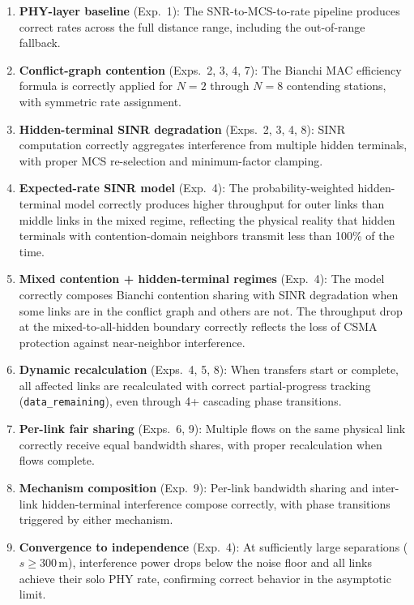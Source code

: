 \documentclass[11pt,a4paper]{article}
\begin{document}
\begin{enumerate}
    \item \textbf{PHY-layer baseline} (Exp.~1): The SNR-to-MCS-to-rate pipeline produces correct rates across the full distance range, including the out-of-range fallback.

    \item \textbf{Conflict-graph contention} (Exps.~2, 3, 4, 7): The Bianchi MAC efficiency formula is correctly applied for $N = 2$ through $N = 8$ contending stations, with symmetric rate assignment.

    \item \textbf{Hidden-terminal SINR degradation} (Exps.~2, 3, 4, 8): SINR computation correctly aggregates interference from multiple hidden terminals, with proper MCS re-selection and minimum-factor clamping.

    \item \textbf{Expected-rate SINR model} (Exp.~4): The probability-weighted hidden-terminal model correctly produces higher throughput for outer links than middle links in the mixed regime, reflecting the physical reality that hidden terminals with contention-domain neighbors transmit less than 100\% of the time.

    \item \textbf{Mixed contention + hidden-terminal regimes} (Exp.~4): The model correctly composes Bianchi contention sharing with SINR degradation when some links are in the conflict graph and others are not. The throughput drop at the mixed-to-all-hidden boundary correctly reflects the loss of CSMA protection against near-neighbor interference.

    \item \textbf{Dynamic recalculation} (Exps.~4, 5, 8): When transfers start or complete, all affected links are recalculated with correct partial-progress tracking (\texttt{data\_remaining}), even through 4+ cascading phase transitions.

    \item \textbf{Per-link fair sharing} (Exps.~6, 9): Multiple flows on the same physical link correctly receive equal bandwidth shares, with proper recalculation when flows complete.

    \item \textbf{Mechanism composition} (Exp.~9): Per-link bandwidth sharing and inter-link hidden-terminal interference compose correctly, with phase transitions triggered by either mechanism.

    \item \textbf{Convergence to independence} (Exp.~4): At sufficiently large separations ($s \geq 300\,$m), interference power drops below the noise floor and all links achieve their solo PHY rate, confirming correct behavior in the asymptotic limit.
\end{enumerate}
\end{document}
